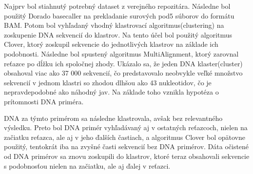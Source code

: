Najprv bol stiahnutý potrebný dataset z verejného repozitára. %
Následne bol použitý Dorado basecaller na prekladanie surových pod5 súborov do formátu BAM.
Potom bol vyhľadaný vhodný klastrovací algoritmus(clustering) na zoskupenie DNA sekvencií do klastrov.
Na tento účel bol použitý algoritmus Clover, ktorý zoskupil sekvencie do jednotlivých klastrov na základe ich podobnosti.
Následne bol spustený algoritmus MultiAlignment, ktorý zarovnal reťazce po dĺžku ich spoločnej zhody.
Ukázalo sa, že jeden DNA klaster(cluster) obsahoval viac ako 37 000 sekvencií, čo predstavovalo neobvykle veľké množstvo sekvencií v jednom klastri
so zhodou dlhšou ako 43 nukleotidov, čo je nepravdepodobné ako náhodný jav.
Na základe toho vznikla hypotéza o prítomnosti DNA priméra.

DNA za týmto primérom sa následne klastrovala, avšak bez relevantného výsledku.
Preto bol DNA primér vyhľadávaný aj v ostatných reťazcoch, nielen na začiatku reťazca, ale aj v jeho ďalších častiach,
a algoritmus Clover bol opätovne použitý, tentokrát iba na zvyšné časti sekvencií bez DNA primérov.
Dáta očistené od DNA primérov sa znovu zoskupili do klastrov, ktoré teraz obsahovali sekvencie
s podobnosťou nielen na začiatku, ale aj ďalej v reťazci.

